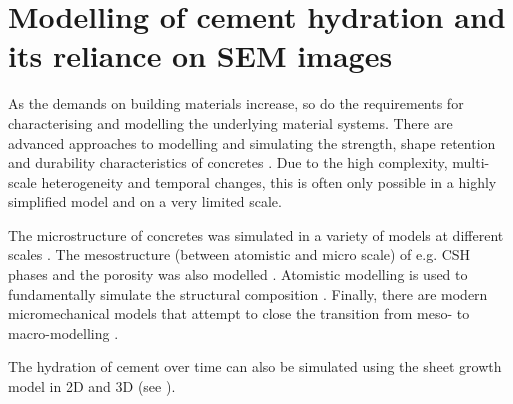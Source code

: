 \FloatBarrier
\section{Modelling of cement hydration and its reliance on \acs*{SEM} images}

As the demands on building materials increase, so do the requirements for characterising and modelling the underlying material systems.
There are advanced approaches to modelling and simulating the strength, shape retention and durability characteristics of concretes \cite{bishnoi.2009, kumar.2017, zhou.2019, ouzia.2019}.
Due to the high complexity, multi-scale heterogeneity and temporal changes, this is often only possible in a highly simplified model and on a very limited scale.

The microstructure of concretes was simulated in a variety of models at different scales \cite{bishnoi.2009, kumar.2017, zhou.2019, ouzia.2019}.
The mesostructure (between atomistic and micro scale) of e.g. \ac{CSH} phases and the porosity was also modelled \cite{ioannidou.2016, yu.2016}.
Atomistic modelling is used to fundamentally simulate the structural composition \cite{kumar.2017,mishra.2017,kunhimohamed.2020,casar.2023}.
Finally, there are modern micromechanical models that attempt to close the transition from meso- to macro-modelling \cite{bernard.2003, hlobil.2016, gobel.2018}.

The hydration of cement over time can also be simulated using the sheet growth model in 2D \cite{etzold.2014} and 3D \cite{nguyen-tuan.2019,nguyen-tuan.2023} (see ).

